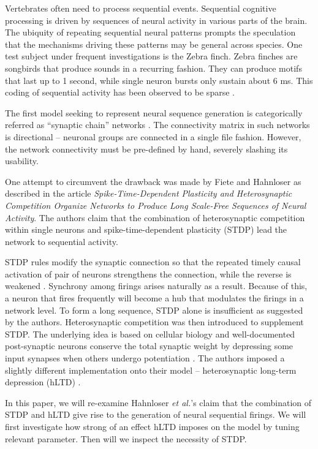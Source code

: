 Vertebrates often need to process sequential events. Sequential cognitive processing is driven by sequences of neural activity in various parts of the brain. The ubiquity of repeating sequential neural patterns prompts the speculation that the mechanisms driving these patterns may be general across species. One test subject under frequent investigations is the Zebra finch. Zebra finches are songbirds that produce sounds in a recurring fashion.  They can produce motifs that last up to 1 second, while single neuron bursts only sustain about 6 ms. This coding of sequential activity has been observed to be sparse \cite{Hahnloser2002}. 

The first model seeking to represent neural sequence generation is categorically referred as “synaptic chain” networks \cite{Kleinfeld1988}. The connectivity matrix in such networks is directional – neuronal groups are connected in a single file fashion. However, the network connectivity must be pre-defined by hand, severely slashing its usability. 

One attempt to circumvent the drawback was made by Fiete and Hahnloser as described in the article \textit{Spike-Time-Dependent Plasticity and Heterosynaptic Competition Organize Networks to Produce Long Scale-Free Sequences of Neural Activity}. The authors claim that the combination of heterosynaptic competition within single neurons and spike-time-dependent plasticity (STDP) lead the network to sequential activity. 

STDP rules modify the synaptic connection so that the repeated timely causal activation of pair of neurons strengthens the connection, while the reverse is weakened \cite{Abbott2000}. Synchrony among firings arises naturally as a result. Because of this, a neuron that fires frequently will become a hub that modulates the firings in a network level. To form a long sequence, STDP alone is insufficient as suggested by the authors. Heterosynaptic competition was then introduced to supplement STDP. The underlying idea is  based on cellular biology and well-documented post-synaptic neurons conserve the total synaptic weight by depressing some input synapses when others undergo potentiation \cite{Royer2003}. The authors imposed a slightly different implementation onto their model – heterosynaptic long-term depression (hLTD) .


In this paper, we will re-examine Hahnloser \textit{et al.}'s claim that the combination of STDP and hLTD give rise to the generation of neural sequential firings. We will first investigate how strong of an effect hLTD imposes on the model by tuning relevant parameter. Then will we inspect the necessity of  STDP. 

